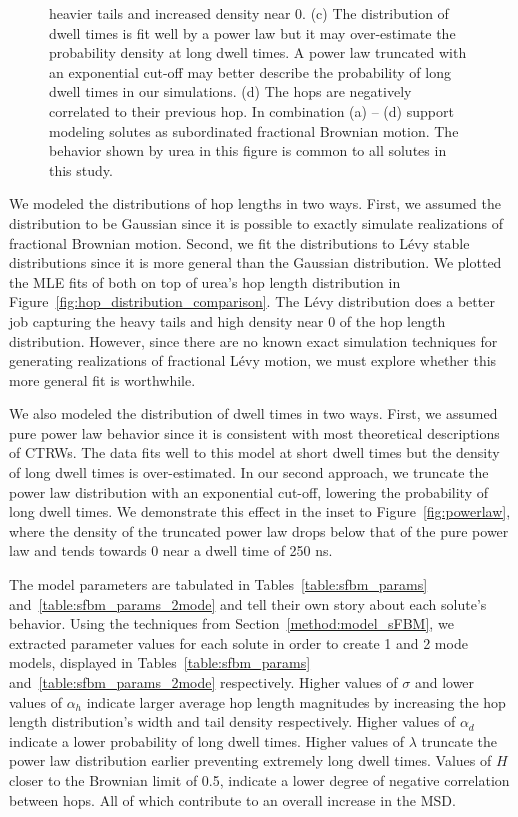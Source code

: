 \documentclass{article}
\begin{document}
\begin{figure}
{  heavier tails and increased density near 0. (c) The distribution of dwell times is fit
  well by a power law but it may over-estimate the probability density at long dwell times.
  A power law truncated with an exponential cut-off may better describe the probability of
  long dwell times in our simulations. (d) The hops are negatively correlated to their previous
  hop. In combination (a) -- (d) support modeling solutes as subordinated fractional Brownian
  motion. The behavior shown by urea in this figure is common to all solutes in this study.}\label{fig:anticorrelated_hops}
  \end{figure}
  
  We modeled the distributions of hop lengths in two ways. First, we assumed the 
  distribution to be Gaussian since it is possible to exactly simulate realizations of
  fractional Brownian motion. Second, we fit the distributions to L\'evy stable 
  distributions since it is more general than the Gaussian distribution. We plotted
  the MLE fits of both on top of urea's hop length distribution in 
  Figure~\ref{fig:hop_distribution_comparison}. The L\'evy distribution does a better
  job capturing the heavy tails and high density near 0 of the hop length distribution.
  However, since there are no known exact simulation techniques for generating 
  realizations of fractional L\'evy motion, we must explore whether this more general
  fit is worthwhile. 
  
  We also modeled the distribution of dwell times in two ways. First, we assumed pure
  power law behavior since it is consistent with most theoretical descriptions of CTRWs.
  The data fits well to this model at short dwell times but
  the density of long dwell times is over-estimated. In our second approach, we truncate
  the power law distribution with an exponential cut-off, lowering the probability of
  long dwell times. We demonstrate this effect in the inset to Figure~\ref{fig:powerlaw}, where the
  density of the truncated power law drops below that of the pure power law and tends towards
  0 near a dwell time of 250 ns.
  
  The model parameters are tabulated in Tables~\ref{table:sfbm_params} 
  and~\ref{table:sfbm_params_2mode} and tell their own story about each solute's behavior. Using the 
  techniques from Section~\ref{method:model_sFBM}, we extracted parameter values for each
  solute in order to create 1 and 2 mode models, displayed in Tables~\ref{table:sfbm_params} 
  and~\ref{table:sfbm_params_2mode} respectively. Higher values of $\sigma$ and lower
  values of $\alpha_h$ indicate larger average hop length magnitudes by increasing the
  hop length distribution's width and tail density respectively. Higher values of $\alpha_d$
  indicate a lower probability of long dwell times. Higher values of $\lambda$ truncate
  the power law distribution earlier preventing extremely long dwell times. Values of $H$
  closer to the Brownian limit of 0.5, indicate a lower degree of negative correlation 
  between hops. All of which contribute to an overall increase in the MSD.
  
\end{document}
